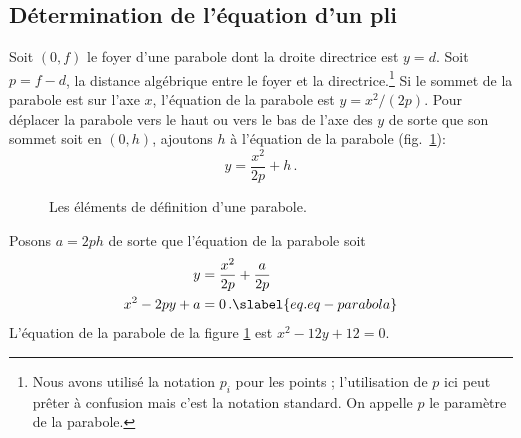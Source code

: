 \subsection{Détermination de l'équation d'un pli}

Soit $(0,f)$ le foyer d'une parabole dont la droite directrice est $y=d$. Soit $p=f-d$, la distance algébrique  entre le foyer et la directrice.\footnote{Nous avons utilisé la notation $p_i$ pour les points ; l'utilisation de $p$ ici peut prêter à confusion mais c'est la notation standard. On appelle $p$  le paramètre de la parabole.} Si le sommet de la parabole est sur l'axe $x$, l'équation de la parabole est $y=x^2/(2p)$. Pour déplacer la parabole vers le haut ou vers le bas de l'axe des $y$ de sorte que son sommet soit en $(0,h)$, ajoutons $h$ à l'équation de la parabole (fig.~\ref{f.elements-parabola}):
\[y=\frac{x^2}{2p}+h\,.\]


\begin{figure}[htb]
\begin{center}
\end{center}
\caption{Les éléments de définition d'une parabole.}\label{f.elements-parabola}
\end{figure}

Posons $a=2ph$ de sorte que l'équation de la parabole soit 
\begin{subequations}
\begin{align}
y&=\frac{x^2}{2p}+\frac{a}{2p}\\
x^2-2py+a&=0\,.\slabel{eq.eq-parabola}
\end{align}
\end{subequations}
L'équation de la parabole de la figure \ref{f.elements-parabola} est  $x^2-12y +12=0$.


